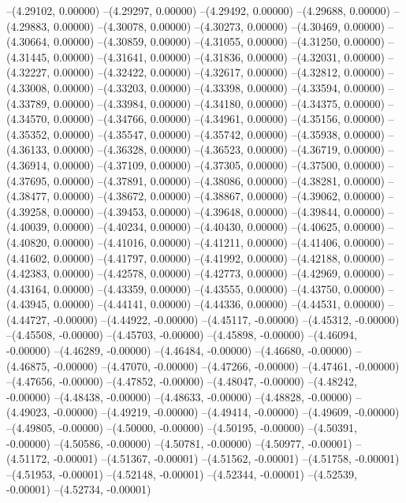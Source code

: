 --(4.29102, 0.00000)
--(4.29297, 0.00000)
--(4.29492, 0.00000)
--(4.29688, 0.00000)
--(4.29883, 0.00000)
--(4.30078, 0.00000)
--(4.30273, 0.00000)
--(4.30469, 0.00000)
--(4.30664, 0.00000)
--(4.30859, 0.00000)
--(4.31055, 0.00000)
--(4.31250, 0.00000)
--(4.31445, 0.00000)
--(4.31641, 0.00000)
--(4.31836, 0.00000)
--(4.32031, 0.00000)
--(4.32227, 0.00000)
--(4.32422, 0.00000)
--(4.32617, 0.00000)
--(4.32812, 0.00000)
--(4.33008, 0.00000)
--(4.33203, 0.00000)
--(4.33398, 0.00000)
--(4.33594, 0.00000)
--(4.33789, 0.00000)
--(4.33984, 0.00000)
--(4.34180, 0.00000)
--(4.34375, 0.00000)
--(4.34570, 0.00000)
--(4.34766, 0.00000)
--(4.34961, 0.00000)
--(4.35156, 0.00000)
--(4.35352, 0.00000)
--(4.35547, 0.00000)
--(4.35742, 0.00000)
--(4.35938, 0.00000)
--(4.36133, 0.00000)
--(4.36328, 0.00000)
--(4.36523, 0.00000)
--(4.36719, 0.00000)
--(4.36914, 0.00000)
--(4.37109, 0.00000)
--(4.37305, 0.00000)
--(4.37500, 0.00000)
--(4.37695, 0.00000)
--(4.37891, 0.00000)
--(4.38086, 0.00000)
--(4.38281, 0.00000)
--(4.38477, 0.00000)
--(4.38672, 0.00000)
--(4.38867, 0.00000)
--(4.39062, 0.00000)
--(4.39258, 0.00000)
--(4.39453, 0.00000)
--(4.39648, 0.00000)
--(4.39844, 0.00000)
--(4.40039, 0.00000)
--(4.40234, 0.00000)
--(4.40430, 0.00000)
--(4.40625, 0.00000)
--(4.40820, 0.00000)
--(4.41016, 0.00000)
--(4.41211, 0.00000)
--(4.41406, 0.00000)
--(4.41602, 0.00000)
--(4.41797, 0.00000)
--(4.41992, 0.00000)
--(4.42188, 0.00000)
--(4.42383, 0.00000)
--(4.42578, 0.00000)
--(4.42773, 0.00000)
--(4.42969, 0.00000)
--(4.43164, 0.00000)
--(4.43359, 0.00000)
--(4.43555, 0.00000)
--(4.43750, 0.00000)
--(4.43945, 0.00000)
--(4.44141, 0.00000)
--(4.44336, 0.00000)
--(4.44531, 0.00000)
--(4.44727, -0.00000)
--(4.44922, -0.00000)
--(4.45117, -0.00000)
--(4.45312, -0.00000)
--(4.45508, -0.00000)
--(4.45703, -0.00000)
--(4.45898, -0.00000)
--(4.46094, -0.00000)
--(4.46289, -0.00000)
--(4.46484, -0.00000)
--(4.46680, -0.00000)
--(4.46875, -0.00000)
--(4.47070, -0.00000)
--(4.47266, -0.00000)
--(4.47461, -0.00000)
--(4.47656, -0.00000)
--(4.47852, -0.00000)
--(4.48047, -0.00000)
--(4.48242, -0.00000)
--(4.48438, -0.00000)
--(4.48633, -0.00000)
--(4.48828, -0.00000)
--(4.49023, -0.00000)
--(4.49219, -0.00000)
--(4.49414, -0.00000)
--(4.49609, -0.00000)
--(4.49805, -0.00000)
--(4.50000, -0.00000)
--(4.50195, -0.00000)
--(4.50391, -0.00000)
--(4.50586, -0.00000)
--(4.50781, -0.00000)
--(4.50977, -0.00001)
--(4.51172, -0.00001)
--(4.51367, -0.00001)
--(4.51562, -0.00001)
--(4.51758, -0.00001)
--(4.51953, -0.00001)
--(4.52148, -0.00001)
--(4.52344, -0.00001)
--(4.52539, -0.00001)
--(4.52734, -0.00001)
